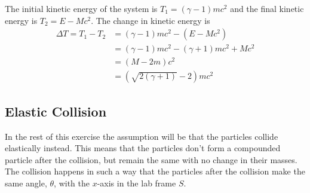 \documentclass[11pt]{amsart}
\begin{document}
The initial kinetic energy of the system is $T_1 = (\gamma-1)mc^2$ and the final kinetic energy is $T_2 = E - Mc^2$. The change in kinetic energy is
\begin{align}
\Delta T = T_1 - T_2 	&= (\gamma - 1)mc^2 - (E-Mc^2) \nonumber \\
						&= (\gamma - 1)mc^2 - (\gamma + 1)mc^2 + Mc^2 \nonumber \\
						&= (M - 2m)c^2 \nonumber \\
						&= (\sqrt{2(\gamma + 1)} - 2)mc^2
\end{align}

\subsection{Elastic Collision}
In the rest of this exercise the assumption will be that the particles collide elastically instead. This means that the particles don't form a compounded particle after the collision, but remain the same with no change in their masses. The collision happens in such a way that the particles after the collision make the same angle, $\theta$, with the $x$-axis in the lab frame $S$.
\end{document}
